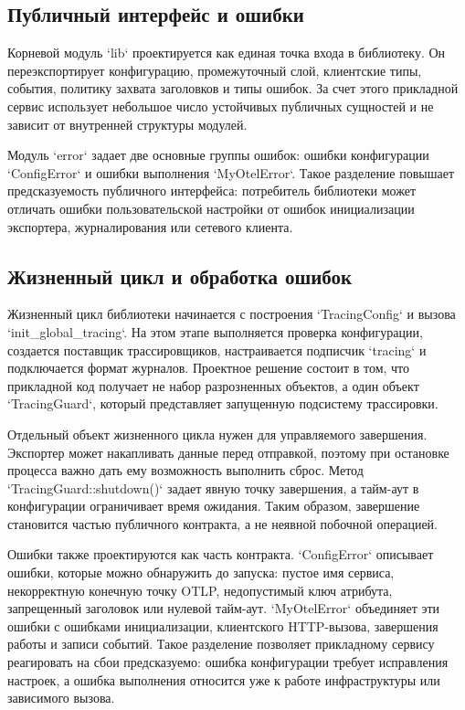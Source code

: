 \subsection{Публичный интерфейс и ошибки}

Корневой модуль `lib` проектируется как единая точка входа в библиотеку. Он
переэкспортирует конфигурацию, промежуточный слой, клиентские типы, события,
политику захвата заголовков и типы ошибок. За счет этого прикладной сервис
использует небольшое число устойчивых публичных сущностей и не зависит от
внутренней структуры модулей.

Модуль `error` задает две основные группы ошибок: ошибки конфигурации
`ConfigError` и ошибки выполнения `MyOtelError`. Такое разделение повышает
предсказуемость публичного интерфейса: потребитель библиотеки может отличать
ошибки пользовательской настройки от ошибок инициализации экспортера,
журналирования или сетевого клиента.

\subsection{Жизненный цикл и обработка ошибок}

Жизненный цикл библиотеки начинается с построения `TracingConfig` и вызова
`init_global_tracing`. На этом этапе выполняется проверка конфигурации,
создается поставщик трассировщиков, настраивается подписчик `tracing` и
подключается формат журналов. Проектное решение состоит в том, что прикладной
код получает не набор разрозненных объектов, а один объект `TracingGuard`,
который представляет запущенную подсистему трассировки.

Отдельный объект жизненного цикла нужен для управляемого завершения. Экспортер
может накапливать данные перед отправкой, поэтому при остановке процесса важно
дать ему возможность выполнить сброс. Метод `TracingGuard::shutdown()` задает
явную точку завершения, а тайм-аут в конфигурации ограничивает время ожидания.
Таким образом, завершение становится частью публичного контракта, а не
неявной побочной операцией.

Ошибки также проектируются как часть контракта. `ConfigError` описывает ошибки,
которые можно обнаружить до запуска: пустое имя сервиса, некорректную конечную
точку OTLP, недопустимый ключ атрибута, запрещенный заголовок или нулевой
тайм-аут. `MyOtelError` объединяет эти ошибки с ошибками инициализации,
клиентского HTTP-вызова, завершения работы и записи событий. Такое разделение
позволяет прикладному сервису реагировать на сбои предсказуемо: ошибка
конфигурации требует исправления настроек, а ошибка выполнения относится уже к
работе инфраструктуры или зависимого вызова.

